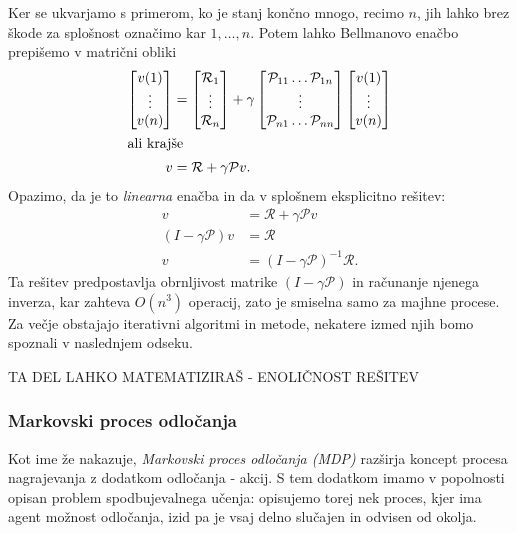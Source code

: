 \documentclass[12pt,a4paper]{amsart}
\theoremstyle{definition} %
\theoremstyle{plain} %
\begin{document}
Ker se ukvarjamo s primerom, ko je stanj končno mnogo, recimo $n$, jih lahko brez škode za 
splošnost označimo kar $1, \dots, n$. Potem lahko Bellmanovo enačbo prepišemo v matrični obliki
\begin{align*}
    \begin{bmatrix}
        v(1) \\ 
        \vdots \\ 
        v(n)
    \end{bmatrix}
    &=
    \begin{bmatrix}
        \mathcal{R}_1 \\ 
        \vdots \\ 
        \mathcal{R}_n 
    \end{bmatrix}
    + \gamma
    \begin{bmatrix}
        \mathcal{P}_{11} \dots \mathcal{P}_{1n} \\ 
        \vdots \\ 
        \mathcal{P}_{n1} \dots \mathcal{P}_{nn}
    \end{bmatrix}
    \begin{bmatrix}
        v(1) \\ 
        \vdots \\ 
        v(n)
    \end{bmatrix} \\
    \intertext{ali krajše}
    v &= \mathcal{R} + \gamma \mathcal{P}v.
\end{align*}
Opazimo, da je to \textit{linearna} enačba in da v splošnem eksplicitno rešitev: 
\begin{align*}
    v &= \mathcal{R} + \gamma \mathcal{P}v \\
    (I - \gamma \mathcal{P}) v &= \mathcal{R} \\
    v &= (I - \gamma \mathcal{P})^{-1} \mathcal{R}.
\end{align*}
Ta rešitev predpostavlja obrnljivost matrike $(I - \gamma \mathcal{P})$ in računanje njenega 
inverza, kar zahteva $O(n^3)$ operacij, zato je smiselna samo za majhne procese. Za večje 
obstajajo iterativni algoritmi in metode, nekatere izmed njih bomo spoznali v naslednjem odseku.

TA DEL LAHKO MATEMATIZIRAŠ - ENOLIČNOST REŠITEV

\subsubsection{Markovski proces odločanja}
Kot ime že nakazuje, \textit{Markovski proces odločanja (MDP)} razširja koncept procesa nagrajevanja 
z dodatkom odločanja - akcij. S tem dodatkom imamo v popolnosti opisan problem spodbujevalnega 
učenja: opisujemo torej nek proces, kjer ima agent možnost odločanja, izid pa je vsaj delno slučajen 
in odvisen od okolja. 
\end{document}
